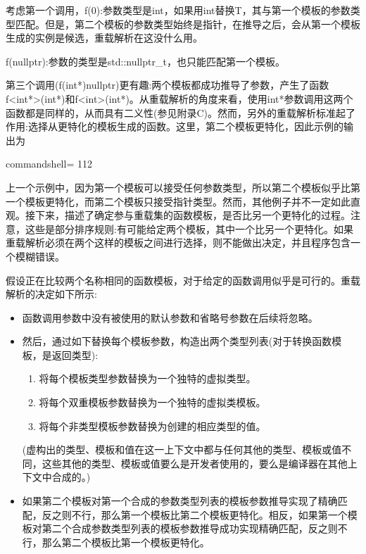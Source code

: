 考虑第一个调用，f(0):参数类型是int，如果用int替换T，其与第一个模板的参数类型匹配。但是，第二个模板的参数类型始终是指针，在推导之后，会从第一个模板生成的实例是候选，重载解析在这没什么用。

f(nullptr):参数的类型是std::nullptr\_t，也只能匹配第一个模板。

第三个调用(f(int*)nullptr)更有趣:两个模板都成功推导了参数，产生了函数f<int*>(int*)和f<int>(int*)。从重载解析的角度来看，使用int*参数调用这两个函数都是同样的，从而具有二义性(参见附录C)。然而，另外的重载解析标准起了作用:选择从更特化的模板生成的函数。这里，第二个模板更特化，因此示例的输出为

\begin{tcblisting}{commandshell={}}
112
\end{tcblisting}


上一个示例中，因为第一个模板可以接受任何参数类型，所以第二个模板似乎比第一个模板更特化，而第二个模板只接受指针类型。然而，其他例子并不一定如此直观。接下来，描述了确定参与重载集的函数模板，是否比另一个更特化的过程。注意，这些是部分排序规则:有可能给定两个模板，其中一个比另一个更特化。如果重载解析必须在两个这样的模板之间进行选择，则不能做出决定，并且程序包含一个模糊错误。

假设正在比较两个名称相同的函数模板，对于给定的函数调用似乎是可行的。重载解析的决定如下所示:


\begin{itemize}
\item 
函数调用参数中没有被使用的默认参数和省略号参数在后续将忽略。

\item 
然后，通过如下替换每个模板参数，构造出两个类型列表(对于转换函数模板，是返回类型):

\begin{enumerate}
\item 
将每个模板类型参数替换为一个独特的虚拟类型。

\item 
将每个双重模板参数替换为一个独特的虚拟类模板。

\item 
将每个非类型模板参数替换为创建的相应类型的值。
\end{enumerate}

(虚构出的类型、模板和值在这一上下文中都与任何其他的类型、模板或值不同，这些其他的类型、模板或值要么是开发者使用的，要么是编译器在其他上下文中合成的。)

\item 
如果第二个模板对第一个合成的参数类型列表的模板参数推导实现了精确匹配，反之则不行，那么第一个模板比第二个模板更特化。相反，如果第一个模板对第二个合成参数类型列表的模板参数推导成功实现精确匹配，反之则不行，那么第二个模板比第一个模板更特化。
\end{itemize}


